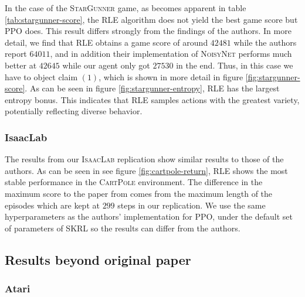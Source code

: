 \documentclass[10pt]{article} %
\begin{document}
\noindent In the case of the \textsc{StarGunner} game, as becomes apparent in table \ref{tab:stargunner-score}, the \textsc{RLE} algorithm does not yield the best game score but \textsc{PPO} does. This result differs strongly from the findings of the authors. In more detail, we find that \textsc{RLE} obtains a game score of around $42481$ while the authors report $64011$, and in addition their implementation of \textsc{NoisyNet} performs much better at $42645$ while our agent only got $27530$ in the end. Thus, in this case we have to object claim $(1)$, which is shown in more detail in figure \ref{fig:stargunner-score}. As can be seen in figure \ref{fig:stargunner-entropy}, \textsc{RLE} has the largest entropy bonus. This indicates that \textsc{RLE} samples actions with the greatest variety, potentially reflecting diverse behavior.

\subsubsection{IsaacLab}

The results from our \textsc{IsaacLab} replication show similar results to those of the authors. As can be seen in see figure \ref{fig:cartpole-return}, \textsc{RLE} shows the most stable performance in the \textsc{CartPole} environment. The difference in the maximum score to the paper from \cite{rle-paper} comes from the maximum length of the episodes which are kept at $299$ steps in our replication. We use the same hyperparameters as the authors' implementation for \textsc{PPO}, under the default set of parameters of SKRL so the results can differ from the authors.

\subsection{Results beyond original paper}

\subsubsection{Atari}
\end{document}
